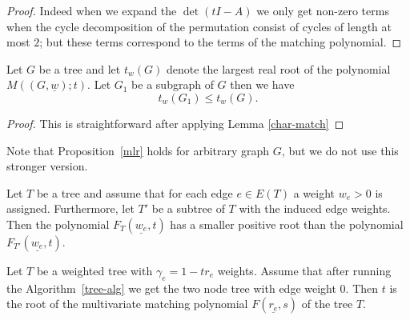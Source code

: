\documentclass[12pt,a4paper]{amsart}
\numberwithin{equation}{section}
\begin{document}
\begin{proof} Indeed when we expand the $\det(tI-A)$ we only get non-zero
  terms when the cycle decomposition of the permutation consist of cycles of
  length at most $2$; but these terms correspond to the terms of the matching
  polynomial.  
\end{proof}

\begin{prop} \label{mlr} Let $G$ be a tree and let $t_w(G)$ denote the
  largest real root of the polynomial 
  $M((G,\underline{w});t)$. Let $G_1$ be a subgraph of $G$ then we have 
$$t_w(G_1)\leq t_w(G).$$
\end{prop}

\begin{proof}
This is straightforward after applying Lemma \ref{char-match}
\end{proof}

Note that Proposition~\ref{mlr} holds for arbitrary graph $G$, but we do not
use this stronger version. 

\begin{cor} \label{TC1} Let $T$ be a tree and assume that for each edge $e\in
  E(T)$ a 
  weight $w_e>0$ is assigned. Furthermore, let $T'$ be a subtree of $T$ with
  the induced edge weights. Then the polynomial $F_T(\underline{w_e},t)$ has a
  smaller positive root than the polynomial $F_{T'}(\underline{w_e},t)$.
\end{cor}

\begin{lemma} \label{TL2} Let $T$ be a weighted tree with $\gamma_e=1-tr_e$
  weights. Assume that after running the Algorithm~\ref{tree-alg} we get the
  two node tree with edge weight $0$. Then $t$ is the root of the
  multivariate matching polynomial $F(\underline{r_e},s)$ of the tree $T$. 
\end{lemma}
\end{document}
